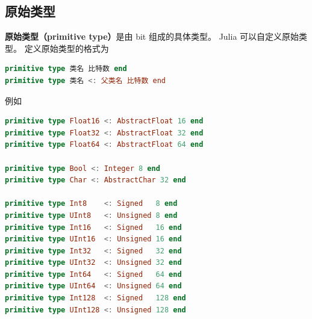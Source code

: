 \subsection{原始类型}
\textbf{原始类型（primitive type）}是由 bit 组成的具体类型。 Julia 可以自定义原始类型。 定义原始类型的格式为
\begin{lstlisting}[language=julia]
primitive type 类名 比特数 end
primitive type 类名 <: 父类名 比特数 end
\end{lstlisting}
例如
\begin{lstlisting}[language=julia]
primitive type Float16 <: AbstractFloat 16 end
primitive type Float32 <: AbstractFloat 32 end
primitive type Float64 <: AbstractFloat 64 end

primitive type Bool <: Integer 8 end
primitive type Char <: AbstractChar 32 end

primitive type Int8    <: Signed   8 end
primitive type UInt8   <: Unsigned 8 end
primitive type Int16   <: Signed   16 end
primitive type UInt16  <: Unsigned 16 end
primitive type Int32   <: Signed   32 end
primitive type UInt32  <: Unsigned 32 end
primitive type Int64   <: Signed   64 end
primitive type UInt64  <: Unsigned 64 end
primitive type Int128  <: Signed   128 end
primitive type UInt128 <: Unsigned 128 end
\end{lstlisting}

